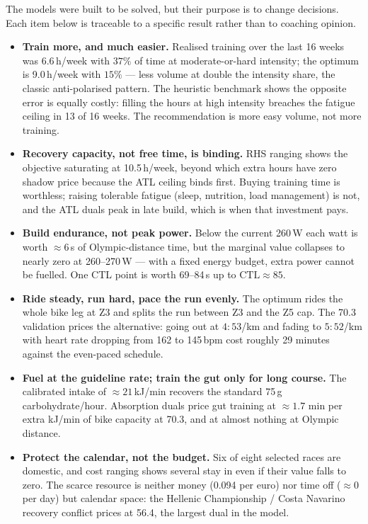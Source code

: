 \documentclass[11pt,a4paper]{article}
\begin{document}
The models were built to be solved, but their purpose is to change decisions.
Each item below is traceable to a specific result rather than to coaching
opinion.

\begin{itemize}\itemsep2pt
\item \textbf{Train more, and much easier.} Realised training over the last 16
weeks was 6.6\,h/week with $37\%$ of time at moderate-or-hard intensity; the
optimum is 9.0\,h/week with $15\%$ --- less volume at double the intensity
share, the classic anti-polarised pattern. The heuristic benchmark shows the
opposite error is equally costly: filling the hours at high intensity breaches
the fatigue ceiling in 13 of 16 weeks. The recommendation is more easy volume,
not more training.

\item \textbf{Recovery capacity, not free time, is binding.} RHS ranging shows
the objective saturating at 10.5\,h/week, beyond which extra hours have zero
shadow price because the ATL ceiling binds first. Buying training time is
worthless; raising tolerable fatigue (sleep, nutrition, load management) is not,
and the ATL duals peak in late build, which is when that investment pays.

\item \textbf{Build endurance, not peak power.} Below the current 260\,W each
watt is worth $\approx 6$\,s of Olympic-distance time, but the marginal value
collapses to nearly zero at 260--270\,W --- with a fixed energy budget, extra
power cannot be fuelled. One CTL point is worth 69--84\,s up to
$\text{CTL} \approx 85$.

\item \textbf{Ride steady, run hard, pace the run evenly.} The optimum rides
the whole bike leg at Z3 and splits the run between Z3 and the Z5 cap. The 70.3
validation prices the alternative: going out at $4{:}53$/km and fading to
$5{:}52$/km with heart rate dropping from 162 to 145\,bpm cost roughly 29
minutes against the even-paced schedule.

\item \textbf{Fuel at the guideline rate; train the gut only for long course.}
The calibrated intake of $\approx 21$\,kJ/min recovers the standard 75\,g
carbohydrate/hour. Absorption duals price gut training at $\approx 1.7$ min per
extra kJ/min of bike capacity at 70.3, and at almost nothing at Olympic
distance.

\item \textbf{Protect the calendar, not the budget.} Six of eight selected
races are domestic, and cost ranging shows several stay in even if their value
falls to zero. The scarce resource is neither money (0.094 per euro) nor time
off ($\approx 0$ per day) but calendar space: the Hellenic Championship /
Costa Navarino recovery conflict prices at 56.4, the largest dual in the model.


\end{itemize}
\end{document}

